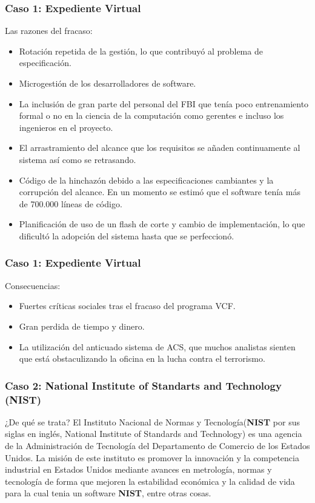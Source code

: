 \documentclass[11pt]{beamer}
\begin{document}
	\begin{frame}
		\frametitle{Caso 1: Expediente Virtual}
		\begin{block}{Las razones del fracaso:}
			\begin{itemize}
				\item Rotación repetida de la gestión, lo que contribuyó al problema de especificación.
				\item Microgestión de los desarrolladores de software.
				\item La inclusión de gran parte del personal del FBI que tenía poco entrenamiento formal o no en la ciencia de la computación como gerentes e incluso los ingenieros en el proyecto.
				\item El arrastramiento del alcance que los requisitos se añaden continuamente al sistema así como se retrasando.
				\item Código de la hinchazón debido a las especificaciones cambiantes y la corrupción del alcance. En un momento se estimó que el software tenía más de 700.000 líneas de código.
				\item Planificación de uso de un flash de corte y cambio de implementación, lo que dificultó la adopción del sistema hasta que se perfeccionó.
			\end{itemize}
		\end{block}
	\end{frame}

	\begin{frame}
		\frametitle{Caso 1: Expediente Virtual}
		\begin{block}{Consecuencias:}
			\begin{itemize}
				\item Fuertes críticas sociales tras el fracaso del programa VCF.
				\item Gran perdida de tiempo y dinero.
				\item La utilización del anticuado sistema de ACS, que muchos analistas sienten que está obstaculizando la oficina en la lucha contra el terrorismo.
			\end{itemize}
		\end{block}
	\end{frame}

	\begin{frame}
		\frametitle{Caso 2: National Institute of Standarts and Technology (NIST)}
		\begin{block}{¿De qué se trata?}
			El Instituto Nacional de Normas y Tecnología(\textbf{NIST} por sus siglas en inglés, National Institute of Standards and Technology) es una agencia de la Administración de Tecnología del Departamento de Comercio de los Estados Unidos. La misión de este instituto es promover la innovación y la competencia industrial en Estados Unidos mediante avances en metrología, normas y tecnología de forma que mejoren la estabilidad económica y la calidad de vida para la cual tenia un software \textbf{NIST}, entre otras cosas.
		\end{block}
	\end{frame}
\end{document}
